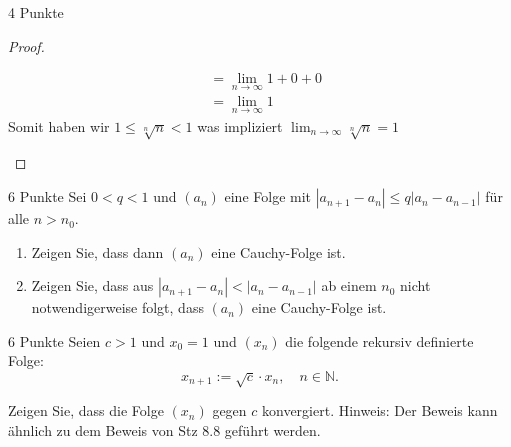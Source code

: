 \documentclass{problemset}
\begin{document}
\begin{problem}{4 Punkte}
\begin{proof}
\begin{enumerate}
\begin{align*}
                                                             & = \lim_{n \to \infty} 1 + 0 + 0                                                                                                     \\
                                                             & = \lim_{n \to \infty} 1
              \end{align*}
              Somit haben wir $1 \le \sqrt[n]{n} < 1$ was impliziert $\lim_{n \to \infty} \sqrt[n]{n} = 1$
              \checkmark
    \end{enumerate}
\end{proof}
\end{problem}

\begin{problem}{6 Punkte}
Sei $0 < q < 1$ und $(a_n)$ eine Folge mit $|a_{n+1} - a_n| \leq q |a_n - a_{n-1}|$ für alle $n > n_0$.

\begin{enumerate}
    \item Zeigen Sie, dass dann $(a_n)$ eine Cauchy-Folge ist.
    \item Zeigen Sie, dass aus $|a_{n+1} - a_n| < |a_n - a_{n-1}|$ ab einem $n_0$ nicht
          notwendigerweise folgt, dass $(a_n)$ eine Cauchy-Folge ist.
\end{enumerate}
\end{problem}

\begin{problem}{6 Punkte}
Seien $c > 1$ und $x_0 = 1$ und $(x_n)$ die folgende rekursiv definierte Folge:
\[
    x_{n+1} := \sqrt{c} \cdot x_n, \quad n \in \mathbb{N}.
\]

Zeigen Sie, dass die Folge $(x_n)$ gegen $c$ konvergiert. Hinweis: Der Beweis
kann ähnlich zu dem Beweis von Stz 8.8 geführt werden.
\end{problem}
\end{document}
